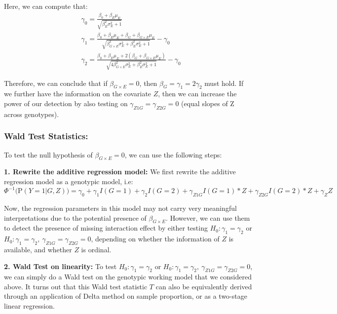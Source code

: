 \documentclass[
]{article}
\begin{document}
Here, we can compute that: \begin{equation}
\begin{aligned}
& \gamma_0 = \frac{\beta_0 + \beta_E \mu_E}{\sqrt{\beta_E^2 \sigma_E^2 + 1}} \\
& \gamma_1 = \frac{\beta_0 + \beta_E \mu_E + \beta_G + \beta_{G\times E} \mu_E}{\sqrt{\beta_{G\times E}^2 \sigma_E^2 + \beta_E^2 \sigma_E^2 + 1}} - \gamma_0 \\
& \gamma_2 = \frac{\beta_0 + \beta_E \mu_E + 2(\beta_G + \beta_{G\times E} \mu_E)}{\sqrt{4\beta_{G\times E}^2 \sigma_E^2 + \beta_E^2 \sigma_E^2 + 1}} - \gamma_0
\end{aligned}
\end{equation}

Therefore, we can conclude that if \(\beta_{G\times E} = 0\), then
\(\beta_G =\gamma_1 = 2\gamma_2\) must hold. If we further have the
information on the covariate \(Z\), then we can increase the power of
our detection by also testing on \(\gamma_{Z1G} = \gamma_{Z2G} =0\)
(equal slopes of Z across genotypes).

\hypertarget{wald-test-statistics}{%
\subsubsection{Wald Test Statistics:}\label{wald-test-statistics}}

To test the null hypothesis of \(\beta_{G\times E} = 0\), we can use the
following steps:

\textbf{1. Rewrite the additive regression model:} We first rewrite the
additive regression model as a genotypic model, i.e:
\[\Phi^{-1} \bigg(\text{P}(Y = 1 | G, Z) \bigg) = \gamma_0 + \gamma_1 I(G = 1) + \gamma_2 I(G=2) + \gamma_{Z1G} I(G=1) * Z + \gamma_{Z2G} I(G=2) * Z + \gamma_Z Z\]

Now, the regression parameters in this model may not carry very
meaningful interpretations due to the potential presence of
\(\beta_{G\times E}\). However, we can use them to detect the presence
of missing interaction effect by either testing
\(H_0: \gamma_1 = \gamma_2\) or
\(H_0: \gamma_1 = \gamma_2, \ \gamma_{Z1G}=\gamma_{Z2G} =0\), depending
on whether the information of \(Z\) is available, and whether \(Z\) is
ordinal.

\textbf{2. Wald Test on linearity:} To test \(H_0: \gamma_1 = \gamma_2\)
or \(H_0: \gamma_1 = \gamma_2, \ \gamma_{Z1G}=\gamma_{Z2G} =0\), we can
simply do a Wald test on the genotypic working model that we considered
above. It turns out that this Wald test statistic \(T\) can also be
equivalently derived through an application of Delta method on sample
proportion, or as a two-stage linear regression.
\end{document}
